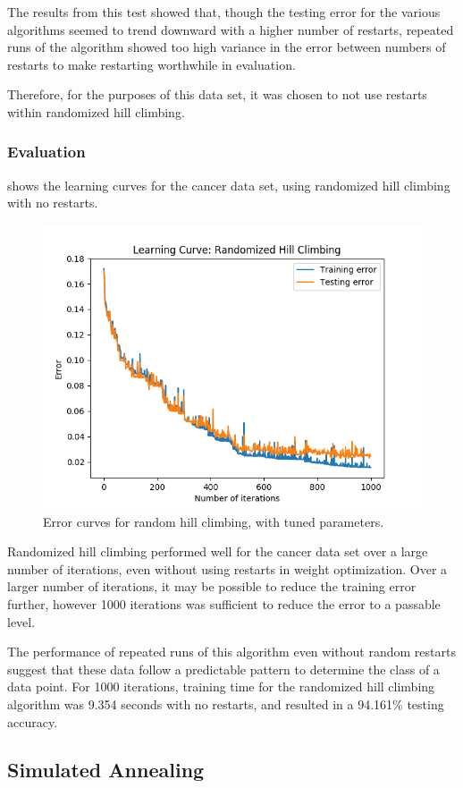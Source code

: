 \documentclass{article}
\begin{document}
        The results from this test showed that, though the testing error for the various algorithms seemed to trend downward with a higher number of restarts, repeated runs of the algorithm showed too high variance in the error between numbers of restarts to make restarting worthwhile in evaluation.

        Therefore, for the purposes of this data set, it was chosen to not use restarts within randomized hill climbing.

      \subsubsection{Evaluation}
         shows the learning curves for the cancer data set, using randomized hill climbing with no restarts.

        \begin{figure}[htb]
        \centering
        \includegraphics[width=.5\linewidth]{out/plot/RHC.png}
        \caption{Error curves for random hill climbing, with tuned parameters.}
        \label{fig:rhc-learning}
        \end{figure}

        Randomized hill climbing performed well for the cancer data set over a large number of iterations, even without using restarts in weight optimization. Over a larger number of iterations, it may be possible to reduce the training error further, however 1000 iterations was sufficient to reduce the error to a passable level.

        The performance of repeated runs of this algorithm even without random restarts suggest that these data follow a predictable pattern to determine the class of a data point. For 1000 iterations, training time for the randomized hill climbing algorithm was 9.354 seconds with no restarts, and resulted in a 94.161\% testing accuracy.

    \subsection{Simulated Annealing}
\end{document}
